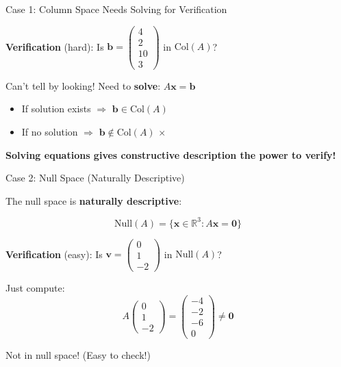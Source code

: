 \documentclass[10pt]{beamer}
\theoremstyle{definition}
\newcommand{\x}[1]{\alert{\textbf{#1}}}
\begin{document}
\begin{frame}{Case 1: Column Space Needs Solving for Verification}

\x{Verification} (hard): Is $\mathbf{b} = \begin{pmatrix} 4\\2\\10\\3 \end{pmatrix}$ in $\text{Col}(A)$?

\vspace{1em}

Can't tell by looking! Need to \x{solve}: $A\mathbf{x} = \mathbf{b}$

\vspace{1em}

\begin{itemize}
\item If solution exists $\Rightarrow$ $\mathbf{b} \in \text{Col}(A)$ \checkmark
\item If no solution $\Rightarrow$ $\mathbf{b} \notin \text{Col}(A)$ $\times$
\end{itemize}

\vspace{1em}

\x{Solving equations gives constructive description the power to verify!}

\end{frame}

\begin{frame}{Case 2: Null Space (Naturally Descriptive)}

The null space is \x{naturally descriptive}:

$$\text{Null}(A) = \{\mathbf{x} \in \mathbb{R}^3 : A\mathbf{x} = \mathbf{0}\}$$

\vspace{1em}

\x{Verification} (easy): Is $\mathbf{v} = \begin{pmatrix} 0\\1\\-2 \end{pmatrix}$ in $\text{Null}(A)$?

\vspace{0.5em}

Just compute:
$$A\begin{pmatrix} 0\\1\\-2 \end{pmatrix} = \begin{pmatrix} -4\\-2\\-6\\0 \end{pmatrix} \neq \mathbf{0}$$

Not in null space! (Easy to check!)

\end{frame}
\end{document}
